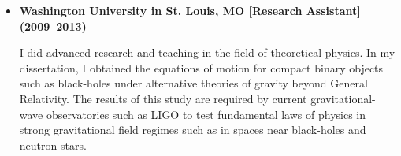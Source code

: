 \documentclass[10pt,a4paper]{moderncv}
\begin{document}
\begin{itemize}
\vspace{.2cm}
\item \textbf{Washington University in St. Louis, MO [Research Assistant] (2009--2013)}

I did advanced research and teaching in the field of theoretical physics. In my dissertation, I obtained the equations of motion for compact binary objects such as black-holes under alternative theories of gravity beyond General Relativity. The results of this study are required by current gravitational-wave observatories such as LIGO to test fundamental laws of physics in strong gravitational field regimes such as in spaces near black-holes and neutron-stars.
\end{itemize}


\end{document}
